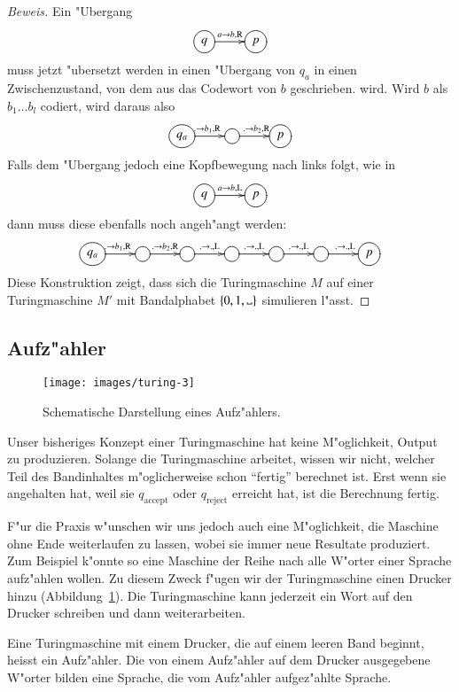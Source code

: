 \begin{proof}[Beweis]
Ein "Ubergang
\[
\entrymodifiers={++[o][F]}
\xymatrix{
q\ar[r]^{a\to b,\text{R}}
	&p
}
\]
muss jetzt "ubersetzt werden in einen "Ubergang von $q_a$ in einen
Zwischenzustand, von dem aus das Codewort von $b$ geschrieben.
wird. Wird $b$ als $b_1\dots b_l$ codiert, wird daraus also
\[
\entrymodifiers={++[o][F]}
\xymatrix{
q_a\ar[r]^{.\to b_1,\text{R}}
	&\ar[r]^{.\to b_2,\text{R}}
		&p
}
\]
Falls dem "Ubergang jedoch eine Kopfbewegung nach links folgt, wie in
\[
\entrymodifiers={++[o][F]}
\xymatrix{
q\ar[r]^{a\to b,\text{L}}
	&p
}
\]
dann muss diese ebenfalls noch angeh"angt werden:
\[
\entrymodifiers={++[o][F]}
\xymatrix{
q_a\ar[r]^{.\to b_1,\text{R}}
	&\ar[r]^{.\to b_2,\text{R}}
		&\ar[r]^{.\to .,\text{L}}
			&\ar[r]^{.\to .,\text{L}}
				&\ar[r]^{.\to .,\text{L}}
					&\ar[r]^{.\to .,\text{L}}
						&p
}
\]
Diese Konstruktion zeigt, dass sich die Turingmaschine $M$ auf einer
Turingmaschine $M'$ mit Bandalphabet $\{0,1,\blank\}$ simulieren
l"asst.
\end{proof}

\subsection{Aufz"ahler}
\begin{figure}
\begin{center}
\texttt{[image: images/turing-3]}
\end{center}
\caption{Schematische Darstellung eines Aufz"ahlers.\label{turing-aufzaehler}}
\end{figure}
Unser bisheriges Konzept einer Turingmaschine hat keine M"oglichkeit,
Output zu produzieren. Solange die Turingmaschine arbeitet, wissen wir
nicht, welcher Teil des Bandinhaltes m"oglicherweise schon ``fertig''
berechnet ist. Erst wenn sie angehalten hat, weil sie $q_{\text{accept}}$
oder $q_{\text{reject}}$ erreicht hat, ist die Berechnung fertig.

F"ur die Praxis w"unschen wir uns jedoch auch eine M"oglichkeit,
die Maschine ohne Ende weiterlaufen zu lassen, wobei sie immer neue
Resultate produziert. Zum Beispiel k"onnte so eine Maschine der Reihe
nach alle W"orter einer Sprache aufz"ahlen wollen. Zu diesem Zweck
f"ugen wir der Turingmaschine einen Drucker hinzu
(Abbildung~\ref{turing-aufzaehler}). Die Turingmaschine
kann jederzeit ein Wort auf den Drucker schreiben und dann
weiterarbeiten.

\begin{definition}
Eine Turingmaschine mit einem Drucker, die auf einem leeren Band beginnt,
heisst ein Aufz"ahler. Die von einem Aufz"ahler auf dem Drucker ausgegebene
W"orter bilden eine Sprache, die vom Aufz"ahler aufgez"ahlte Sprache.
\end{definition}

